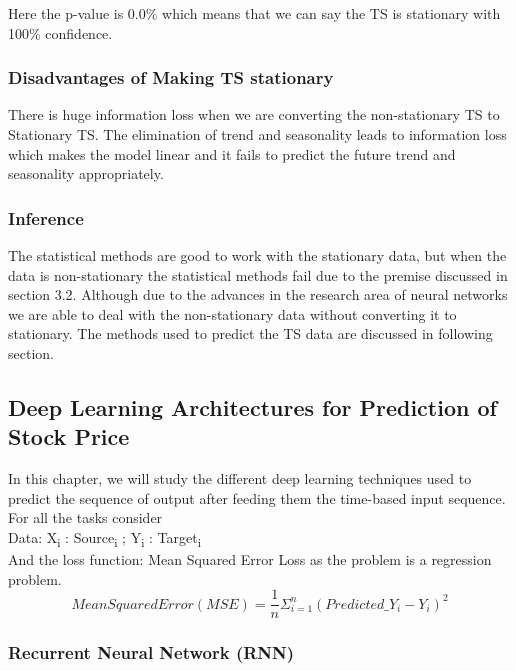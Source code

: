 			Here the p-value is 0.0\% which means that we can say the TS is stationary with 100\% confidence.


	\subsubsection{Disadvantages of Making TS stationary}

		There is huge information loss when we are converting the non-stationary TS to Stationary TS. The elimination of trend and seasonality leads to information loss which makes the model linear and it fails to predict the future trend and seasonality appropriately. 

	\subsubsection{Inference}

		The statistical methods are good to work with the stationary data, but when the data is non-stationary the statistical methods fail due to the premise discussed in section 3.2. Although due to the advances in the research area of neural networks we are able to deal with the non-stationary data without converting it to stationary. The methods used to predict the TS data are discussed in following section.


\subsection{Deep Learning Architectures for Prediction of Stock Price}

In this chapter, we will study the different deep learning techniques used to predict the sequence of output after feeding them the time-based input sequence.\\ 
For all the tasks consider\\
Data: {X\textsubscript{i} : Source\textsubscript{i} ; Y\textsubscript{i} : Target\textsubscript{i} }\\
And the loss function: Mean Squared Error Loss as the problem is a regression problem. \\
\begin{equation}Mean Squared Error (MSE) =  \frac{1}{n}\Sigma_{i=1}^{n} (Predicted\_Y_{i} - Y_{i})^2 \end{equation}

\subsubsection{Recurrent Neural Network (RNN)}

